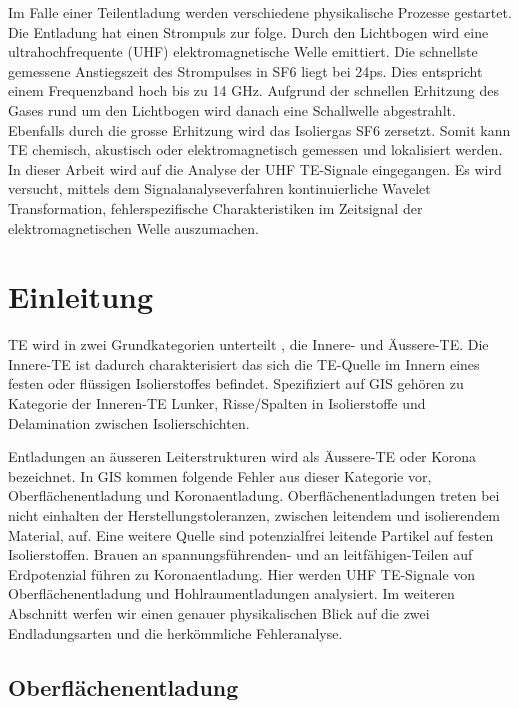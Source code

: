 \begin{refsection}
Im Falle einer Teilentladung werden verschiedene  physikalische Prozesse gestartet. 
Die Entladung hat einen Strompuls zur folge.
Durch den Lichtbogen wird eine ultrahochfrequente (UHF) elektromagnetische Welle emittiert.
Die schnellste gemessene Anstiegszeit des Strompulses in SF6 liegt bei 24ps.
Dies entspricht einem Frequenzband hoch bis zu 14 GHz. \cite{skript:Judd24ps} 
Aufgrund der schnellen Erhitzung des Gases rund um den Lichtbogen wird danach eine Schallwelle abgestrahlt. 
Ebenfalls durch die grosse Erhitzung wird das Isoliergas SF6 zersetzt. 
Somit kann TE chemisch, akustisch oder elektromagnetisch gemessen und lokalisiert werden.\cite{skript:StatusReviewPDMeasurement}
In dieser Arbeit wird auf die Analyse der UHF TE-Signale eingegangen.
Es wird versucht, mittels dem Signalanalyseverfahren kontinuierliche Wavelet Transformation, fehlerspezifische Charakteristiken im Zeitsignal der elektromagnetischen Welle auszumachen.


\section{Einleitung}

TE wird in zwei Grundkategorien unterteilt \cite{buch:Kuchler}, die Innere- und Äussere-TE. 
Die Innere-TE ist dadurch charakterisiert das sich die TE-Quelle im Innern eines festen oder flüssigen Isolierstoffes befindet. 
Spezifiziert auf GIS gehören zu Kategorie der Inneren-TE Lunker, Risse/Spalten in Isolierstoffe und Delamination zwischen Isolierschichten.
 
Entladungen an äusseren Leiterstrukturen wird als Äussere-TE oder Korona bezeichnet. 
In GIS kommen folgende Fehler aus dieser Kategorie vor, Oberflächenentladung und Koronaentladung. 
Oberflächenentladungen treten bei nicht einhalten der Herstellungstoleranzen, zwischen leitendem und isolierendem Material, auf.
Eine weitere Quelle sind potenzialfrei leitende Partikel auf festen Isolierstoffen.
Brauen an spannungsführenden- und an leitfähigen-Teilen auf Erdpotenzial führen zu Koronaentladung. \cite{buch:Kuchler}\cite{skript:AeussreTE}\cite{skript:InnereTE}
Hier werden UHF TE-Signale von Oberflächenentladung und Hohlraumentladungen analysiert. 
Im weiteren Abschnitt werfen wir einen genauer physikalischen Blick auf die zwei Endladungsarten und die herkömmliche Fehleranalyse.

\subsection{Oberflächenentladung}


\end{refsection}
